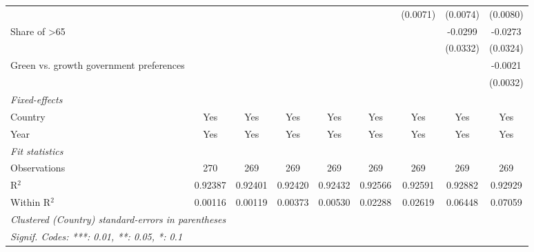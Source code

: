 \begin{table}[htbp]
\begin{tabular}{lcccccccc}
                                                              &          &          &          &          &          & (0.0071) & (0.0074) & (0.0080)\\   
      Share of >65                                            &          &          &          &          &          &          & -0.0299  & -0.0273\\   
                                                              &          &          &          &          &          &          & (0.0332) & (0.0324)\\   
      Green vs. growth government preferences                 &          &          &          &          &          &          &          & -0.0021\\   
                                                              &          &          &          &          &          &          &          & (0.0032)\\   
      \midrule
      \emph{Fixed-effects}\\
      Country                                                 & Yes      & Yes      & Yes      & Yes      & Yes      & Yes      & Yes      & Yes\\  
      Year                                                    & Yes      & Yes      & Yes      & Yes      & Yes      & Yes      & Yes      & Yes\\  
      \midrule
      \emph{Fit statistics}\\
      Observations                                            & 270      & 269      & 269      & 269      & 269      & 269      & 269      & 269\\  
      R$^2$                                                   & 0.92387  & 0.92401  & 0.92420  & 0.92432  & 0.92566  & 0.92591  & 0.92882  & 0.92929\\  
      Within R$^2$                                            & 0.00116  & 0.00119  & 0.00373  & 0.00530  & 0.02288  & 0.02619  & 0.06448  & 0.07059\\  
      \midrule \midrule
      \multicolumn{9}{l}{\emph{Clustered (Country) standard-errors in parentheses}}\\
      \multicolumn{9}{l}{\emph{Signif. Codes: ***: 0.01, **: 0.05, *: 0.1}}\\
   \end{tabular}
\end{table}


